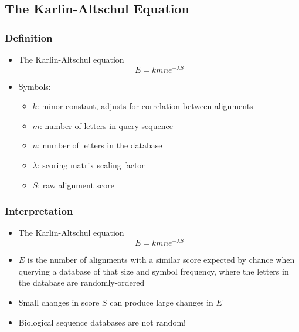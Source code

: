 %

\subsection{The Karlin-Altschul Equation}
\begin{frame}
  \frametitle{Definition}
  \begin{itemize}
    \item The Karlin-Altschul equation
    \begin{equation*}
      E = k m n e^{-\lambda S}
    \end{equation*}
    \item Symbols:
    \begin{itemize}
      \item $k$: minor constant, adjusts for correlation between alignments
      \item $m$: number of letters in query sequence
      \item $n$: number of letters in the database
      \item $\lambda$: scoring matrix scaling factor
      \item $S$: raw alignment score
    \end{itemize}
  \end{itemize}
\end{frame} 

\begin{frame}
  \frametitle{Interpretation}
  \begin{itemize}
    \item The Karlin-Altschul equation
    \begin{equation*}
      E = k m n e^{-\lambda S}
    \end{equation*}
    \item $E$ is the number of alignments with a similar score expected by chance when querying a database of that size and symbol frequency, where the letters in the database are randomly-ordered
    \item Small changes in score $S$ can produce large changes in $E$
    \item Biological sequence databases are not random!
  \end{itemize}
\end{frame} 